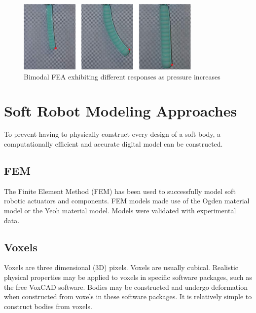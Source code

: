 \begin{figure}[H]
	\centering
	\includegraphics[width=0.8\textwidth]{BimodalActuator.png}
	\caption[Bimodal FEA responses]{Bimodal FEA exhibiting different responses as pressure increases \citep{Ellis2020}}
	\label{fig:bifea}
\end{figure}

\section{Soft Robot Modeling Approaches}

To prevent having to physically construct every design of a soft body, a computationally efficient and accurate digital model can be constructed.

\subsection{FEM}

The Finite Element Method (FEM) has been used to successfully model soft robotic actuators and components. FEM models made use of the Ogden material model or the Yeoh material model. Models were validated with experimental data. \citep{Elsayed2014, Runge2017}

\subsection{Voxels}

Voxels are three dimensional (3D) pixels. Voxels are usually cubical. Realistic physical properties may be applied to voxels in specific software packages, such as the free VoxCAD software. Bodies may be constructed and undergo deformation when constructed from voxels in these software packages. It is relatively simple to construct bodies from voxels. \citep{Cheney2013,Cheney2015}

